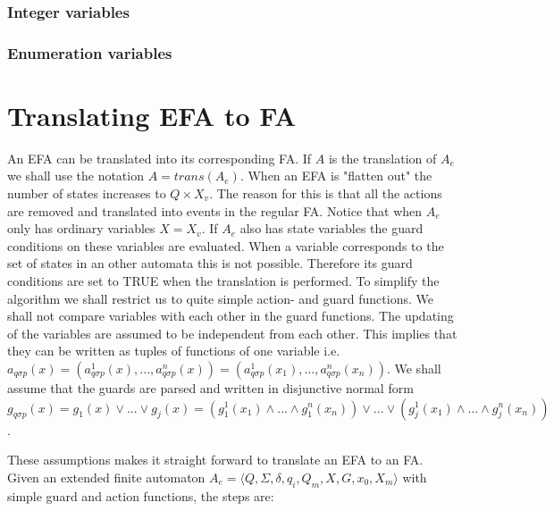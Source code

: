 \documentclass{article}
\begin{document}
\subsubsection{Integer variables}

\subsubsection{Enumeration variables}


\section{Translating EFA to FA}

An EFA can be translated into its corresponding FA.
If $A$ is the translation of $A_e$ we shall use the notation
$A=trans(A_e)$. When an EFA is "flatten out" the number of states
increases to $Q \times X_v $. The reason for this is that all the
actions are removed and translated into events in the regular FA. Notice
that when $A_e$ only has ordinary variables $X=X_v$. If $A_e$ also has
state variables the guard conditions on these variables are evaluated. When a variable
corresponds to the set of states
in an other automata this is not possible. Therefore its guard conditions are set to
TRUE when the translation is performed. To simplify the
algorithm we shall restrict us to quite simple action- and guard
functions. We shall not compare variables with each other in the guard functions.
The updating of the variables are assumed to be independent
from each other. This implies that they can be written as
tuples of functions of one variable i.e.
$a_{q \sigma p}(x)=(a^1_{q \sigma p}(x),...,a^n_{q \sigma p}(x))=(a^1_{q
\sigma p}(x_1),...,a^n_{q \sigma p}(x_n))$. We shall assume that the
guards are parsed and written in disjunctive normal form $g_{q
\sigma p}(x)=g_1(x)\vee ...\vee g_j(x)= (g^{1}_{1}(x_1)\wedge
...\wedge g^{n}_{1}(x_n) )\vee ...\vee (g^{1}_{j}(x_1)\wedge
...\wedge g^{n}_{j}(x_n) )$.

These assumptions makes it
straight forward to translate an EFA to an FA. Given an extended
finite automaton $A_{e}=\langle Q, \Sigma, \delta, q_i, Q_m, X, G
,x_0, X_m \rangle$ with simple guard and
action functions, the steps are:\\
\end{document}
